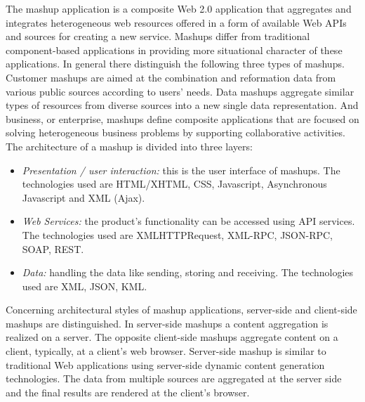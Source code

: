 		The mashup application is a composite Web 2.0 application that aggregates and integrates heterogeneous web resources offered in a form of available Web APIs and sources for creating a new service. Mashups differ from traditional component-based applications in providing more situational character of these applications\cite{yu2008understanding}. In general there distinguish the following three types of mashups\cite{ibrahim2012framework}. Customer mashups are aimed at the combination and reformation data from various public sources according to users’ needs. Data mashups aggregate similar types of resources from diverse sources into a new single data representation. And business, or enterprise, mashups define composite applications that are focused on solving heterogeneous business problems by supporting collaborative activities\cite{hoyer2008enterprise}. The architecture of a mashup is divided into three layers:
			\begin{itemize}
			\item \emph{Presentation / user interaction:} this is the user interface of mashups. The technologies used are HTML/XHTML, CSS, Javascript, Asynchronous Javascript and XML (Ajax).
			\item \emph{Web Services:} the product's functionality can be accessed using API services. The technologies used are XMLHTTPRequest, XML-RPC, JSON-RPC, SOAP, REST.
			\item \emph{Data:} handling the data like sending, storing and receiving. The technologies used are XML, JSON, KML.
			\end{itemize}
		Concerning architectural styles of mashup applications, server-side and client-side mashups are distinguished. In server-side mashups a content aggregation is realized on a server\cite{mashA}. The opposite client-side mashups aggregate content on a client, typically, at a client's web browser\cite{mashB}. Server-side mashup is similar to traditional Web applications using server-side dynamic content generation technologies. The data from multiple sources are aggregated at the server side and the final results are rendered at the client’s browser\cite{bolin2005end}.

